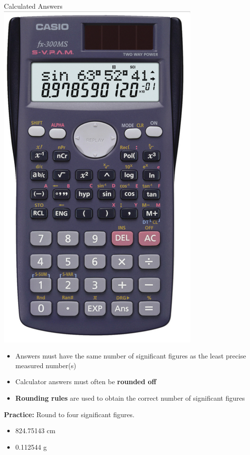 \documentclass[11pt]{beamer}
\begin{document}
\begin{frame}{Calculated Answers}
  \centering
  \includegraphics[scale=0.2]{calc}
  \begin{itemize}
  \item Answers must have the same number of significant
    figures as the least precise measured number(s)
  \item Calculator answers must often be \textbf{rounded off}
  \item \textbf{Rounding rules} are used to obtain the correct
    number of significant figures
  \end{itemize}
\end{frame}

\begin{frame}{\textbf{Practice:} Round to four significant figures.}
  \begin{itemize}
  \item 824.75143 cm
  \item 0.112544 g
  \end{itemize}
\end{frame}
\end{document}

